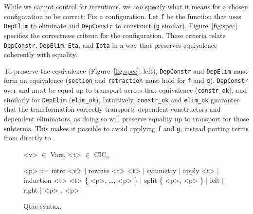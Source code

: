 While we cannot control for intentions, we \textit{can} specify what it means for a chosen configuration to be correct:
Fix a configuration. Let \lstinline{f} be the function that uses \lstinline{DepElim} to eliminate \A and \lstinline{DepConstr} to construct \B (\lstinline{g} similar). %
Figure~\ref{fig:spec} specifies the correctness criteria for the configuration.
These criteria relate \lstinline{DepConstr}, \lstinline{DepElim}, \lstinline{Eta}, and \lstinline{Iota}
in a way that preserves equivalence coherently with equality.

To preserve the equivalence (Figure~\ref{fig:spec}, left), \lstinline{DepConstr} and \lstinline{DepElim} must form an equivalence
(\lstinline{section} and \lstinline{retraction} must hold for \lstinline{f} and \lstinline{g}).
\lstinline{DepConstr} over \A and \B must be equal up to transport across that equivalence (\lstinline{constr_ok}), 
and similarly for \lstinline{DepElim} (\lstinline{elim_ok}).
Intuitively, \lstinline{constr_ok} and \lstinline{elim_ok} guarantee that the transformation
correctly transports dependent constructors and dependent eliminators,
as doing so will preserve equality up to transport for those subterms.
This makes it possible %
to avoid applying \lstinline{f} and \lstinline{g}, instead porting terms from \A directly to \B.


\begin{figure*}
\small
\begin{grammar}
<v> $\in$ Vars, <t> $\in$ CIC$_{\omega}$

<p> ::= intro <v> |  rewrite <t> <t> | symmetry | apply <t> |  induction <t> <t> \{ <p>, \ldots, <p> \} |  split \{ <p>, <p> \} | left | right | <p> . <p>
\end{grammar}
\vspace{-0.3cm}
\caption{Qtac syntax.}
\vspace{-0.3cm}
\label{fig:ltacsyntax1}
\end{figure*}

